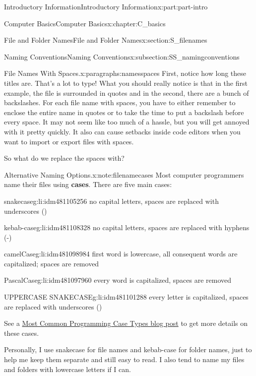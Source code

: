 \documentclass[oneside,10pt,]{book}
\newcommand{\terminology}[1]{\textbf{#1}}
\begin{document}
\begin{partptx}{Introductory Information}{}{Introductory Information}{}{}{x:part:part-intro}
\begin{chapterptx}{Computer Basics}{}{Computer Basics}{}{}{x:chapter:C_basics}
\begin{sectionptx}{File and Folder Names}{}{File and Folder Names}{}{}{x:section:S_filenames}
\begin{subsectionptx}{Naming Conventions}{}{Naming Conventions}{}{}{x:subsection:SS_namingconventions}
\begin{paragraphs}{File Names With Spaces.}{x:paragraphs:namesspaces}
 First, notice how long these titles are. That's a lot to type! What you should really notice is that in the first example, the file is surrounded in quotes and in the second, there are a bunch of backslashes. For each file name with spaces, you have to either remember to enclose the entire name in quotes or to take the time to put a backslash before every space. It may not seem like too much of a hassle, but you will get annoyed with it pretty quickly. It also can cause setbacks inside code editors when you want to import or export files with spaces.%
\par
So what do we replace the spaces with? \begin{note}{Alternative Naming Options.}{x:note:filenamecases}%
Most computer programmers name their files using \terminology{cases}. There are five main cases:%
\begin{descriptionlist}
\begin{dlimedium}{snake\textunderscore{}case}{g:li:idm481105256}%
no capital letters, spaces are replaced with underscores (\textunderscore{})%
\end{dlimedium}%
\begin{dlimedium}{kebab-case}{g:li:idm481108328}%
no capital letters, spaces are replaced with hyphens (-)%
\end{dlimedium}%
\begin{dlimedium}{camelCase}{g:li:idm481098984}%
first word is lowercase, all consequent words are capitalized; spaces are removed%
\end{dlimedium}%
\begin{dlimedium}{PascalCase}{g:li:idm481097960}%
every word is capitalized, spaces are removed%
\end{dlimedium}%
\begin{dlimedium}{UPPER\textunderscore{}CASE\textunderscore{} SNAKE\textunderscore{}CASE}{g:li:idm481101288}%
every letter is capitalized, spaces are replaced with underscores (\textunderscore{})%
\end{dlimedium}%
\end{descriptionlist}
See a \href{https://chaseadams.io/posts/most-common-programming-case-types/}{Most Common Programming Case Types blog post}\footnotemark{} to get more details on these cases.%
\end{note}
%
 Personally, I use snake\textunderscore{}case for file names and kebab-case for folder names, just to help me keep them separate and still easy to read. I also tend to name my files and folders with lowercase letters if I can.%

\end{paragraphs}
\end{subsectionptx}
\end{sectionptx}
\end{chapterptx}
\end{partptx}
\end{document}
